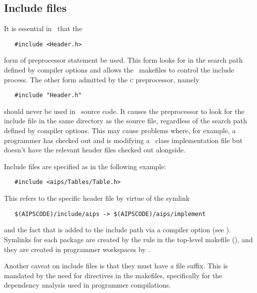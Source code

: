 \subsection*{Include files}

It is essential in \aipspp\ that the

\begin{verbatim}
   #include <Header.h>
\end{verbatim}

\noindent
form of preprocessor  statement be used.  This form looks for
 in the search path defined by  compiler options and
allows the \aipspp\ makefiles to control the include process.  The other form
admitted by the \textsc{c} preprocessor, namely

\begin{verbatim}
   #include "Header.h"
\end{verbatim}

\noindent
should never be used in \aipspp\ source code.  It causes the preprocessor to
look for the include file in the same directory as the source file, regardless
of the search path defined by  compiler options.  This may cause
problems where, for example, a programmer has checked out and is modifying a
\cplusplus\ class implementation file but doesn't have the relevant header
files checked out alongside.

Include files are specified as in the following example:

\begin{verbatim}
   #include <aips/Tables/Table.h>
\end{verbatim}

\noindent
This refers to the specific header file
 by virtue of the symlink

\begin{verbatim}
   $(AIPSCODE)/include/aips -> $(AIPSCODE)/aips/implement
\end{verbatim}

\noindent
and the fact that  is added to the include path via
a  compiler option (see ).  Symlinks for each
package are created by the  rule in the top-level makefile
(), and they are created in programmer
workspaces by .

Another caveat on include files is that they must have a  file
suffix.  This is mandated by the need for  directives in the
makefiles, specifically for the dependency analysis used in programmer
compilations.

